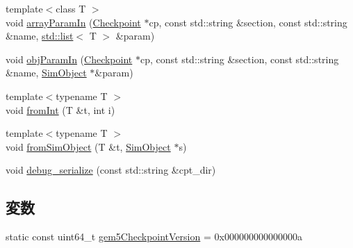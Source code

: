\begin{DoxyCompactItemize}
\item 
{\footnotesize template$<$class T $>$ }\\void \hyperlink{serialize_8hh_ae46dcc0ec3ac204a89456a1aad4c9527}{arrayParamIn} (\hyperlink{classCheckpoint}{Checkpoint} $\ast$cp, const std::string \&section, const std::string \&name, \hyperlink{classstd_1_1list}{std::list}$<$ T $>$ \&param)
\item 
void \hyperlink{serialize_8hh_ada6b7e3d8b5db63bb9afe0f7e07b5f88}{objParamIn} (\hyperlink{classCheckpoint}{Checkpoint} $\ast$cp, const std::string \&section, const std::string \&name, \hyperlink{classSimObject}{SimObject} $\ast$\&param)
\item 
{\footnotesize template$<$typename T $>$ }\\void \hyperlink{serialize_8hh_a6871086760ac1e83663ad779e6160bf6}{fromInt} (T \&t, int i)
\item 
{\footnotesize template$<$typename T $>$ }\\void \hyperlink{serialize_8hh_a6a1352b94f67a077730295ec6e250bb0}{fromSimObject} (T \&t, \hyperlink{classSimObject}{SimObject} $\ast$s)
\item 
void \hyperlink{serialize_8hh_aa5d800dd5f65d4b270d9c4940374807f}{debug\_\-serialize} (const std::string \&cpt\_\-dir)
\end{DoxyCompactItemize}
\subsection*{変数}
\begin{DoxyCompactItemize}
\item 
static const uint64\_\-t \hyperlink{serialize_8hh_a12e740c0c33a4a5fc432413005beae4c}{gem5CheckpointVersion} = 0x000000000000000a
\end{DoxyCompactItemize}


